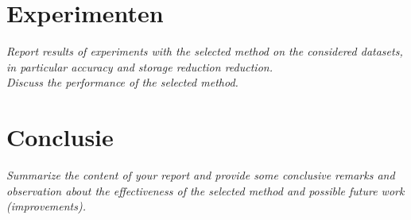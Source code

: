 \documentclass{article}
\begin{document}
\section{Experimenten}
\emph{Report results of experiments with the selected method on the considered datasets, 
in particular accuracy and storage reduction reduction. }\\
\emph{Discuss the performance of the selected method.}\\

\section{Conclusie}
\emph{Summarize the content of your report and provide some conclusive remarks and observation about the effectiveness of the selected method and possible future work (improvements).} \\
\end{document}
